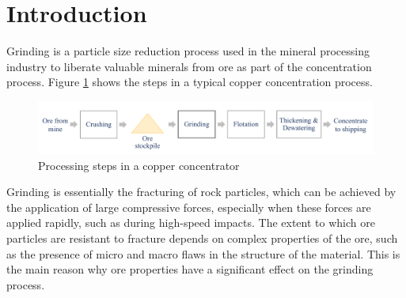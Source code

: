 \chapter*{Introduction}         %
\label{chap-introduction}       %


Grinding is a particle size reduction process used in the mineral processing industry to liberate valuable minerals from ore as part of the concentration process. Figure \ref{fig:process-block-diagram} shows the steps in a typical copper concentration process.
\begin{figure}[htp]
	\centering
	\includegraphics[width=15.5cm]{images/process_block_diagram.pdf}
	\caption{Processing steps in a copper concentrator} \label{fig:process-block-diagram}
\end{figure}

Grinding is essentially the fracturing of rock particles, which can be achieved by the application of large compressive forces, especially when these forces are applied rapidly, such as during high-speed impacts. The extent to which ore particles are resistant to fracture depends on complex properties of the ore, such as the presence of micro and macro flaws in the structure of the material. This is the main reason why ore properties have a significant effect on the grinding process.

